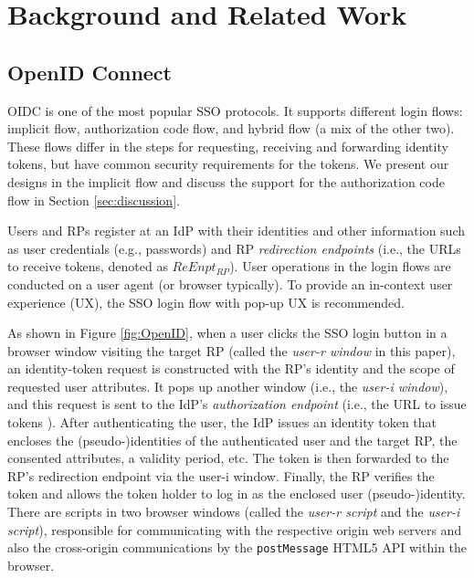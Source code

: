 \section{Background and Related Work}
\label{sec:background}

\subsection{OpenID Connect}
\label{subsec:OIDC}
OIDC is one of the most popular SSO protocols. It supports different login flows: implicit flow, authorization code flow, and hybrid flow (a mix of the other two).
These flows differ in the steps for requesting, receiving and forwarding identity tokens, but have common security requirements for the tokens.
We present our designs in the implicit flow and discuss the support for the authorization code flow in Section \ref{sec:discussion}.

Users and RPs register at an IdP with their identities
and other information such as user credentials (e.g., passwords)
and RP \emph{redirection endpoints} \cite{rfc6749} (i.e., the URLs to receive tokens,
denoted as $ReEnpt_{RP}$).
User operations in the login flows are conducted on a user agent (or browser typically).
To provide an in-context user experience (UX),
    the SSO login flow with pop-up UX \cite{dimvaLiM16,GoogleIdIntegrate,uber} is recommended.

As shown in Figure \ref{fig:OpenID},
when a user clicks the SSO login button in a browser window visiting the target RP 
(called the \emph{user-r window} in this paper),
 an identity-token request is constructed with the RP's identity and the scope of requested user attributes.
It pops up another window (i.e., the \emph{user-i window}),
    and this request is sent to the IdP's \emph{authorization endpoint} (i.e., the URL to issue tokens \cite{rfc6749}).
After authenticating the user, the IdP issues an identity token that encloses the (pseudo-)identities of the authenticated user and the target RP, the consented attributes, a validity period, etc.
The token is then forwarded to the RP's redirection endpoint via the user-i window.
Finally, the RP verifies the token and allows the token holder to log in as the enclosed user (pseudo-)identity.
There are scripts in two browser windows (called the \emph{user-r script} and the \emph{user-i script}),
    responsible for communicating with the respective origin web servers
    and also the cross-origin
communications by the \verb+postMessage+ HTML5 API \cite{postm-targeto} within the browser.


